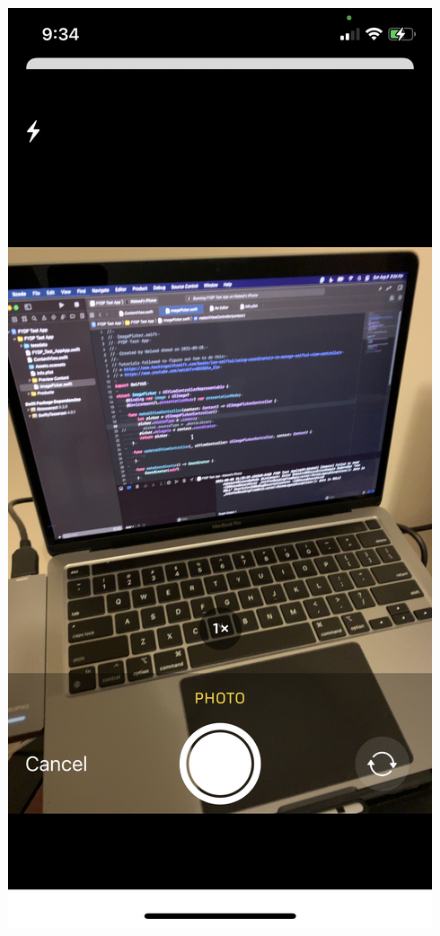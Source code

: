 \documentclass[a4paper,11pt]{article}
\begin{document}
\begin{figure}[H]
\includegraphics[scale=0.1]{img/test_app/testapp_photo.jpeg}

\end{figure}
\end{document}
